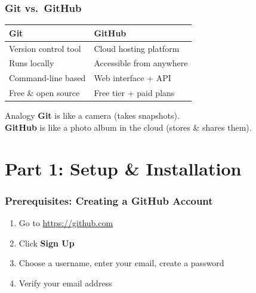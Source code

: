 \documentclass{beamer}
\begin{document}
\begin{frame}
\frametitle{Git vs.\ GitHub}
\begin{table}[h]
\centering
\small
\begin{tabular}{ll}
\toprule
\textbf{Git} & \textbf{GitHub} \\
\midrule
Version control tool & Cloud hosting platform \\
Runs locally & Accessible from anywhere \\
Command-line based & Web interface + API \\
Free \& open source & Free tier + paid plans \\
\bottomrule
\end{tabular}
\end{table}
\vspace{4mm}
\begin{block}{Analogy}
\textbf{Git} is like a camera (takes snapshots). \\
\textbf{GitHub} is like a photo album in the cloud (stores \& shares them).
\end{block}
\end{frame}


\section{Part 1: Setup \& Installation}




\begin{frame}
\frametitle{Prerequisites: Creating a GitHub Account}
\begin{enumerate}
    \item Go to \url{https://github.com}
    \item Click \textbf{Sign Up}
    \item Choose a username, enter your email, create a password
    \item Verify your email address
\end{enumerate}
\vspace{4mm}
\end{frame}
\end{document}
